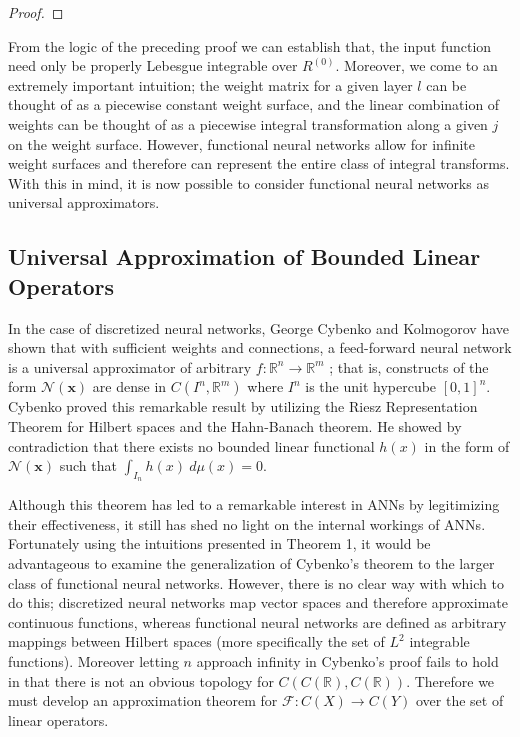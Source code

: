 \begin{proof}
\end{proof}


From the logic of the preceding proof we can establish that, the input function need only be properly Lebesgue integrable over $R^{(0)}$. Moreover, we come to an extremely important intuition; the weight matrix for a given layer $l$ can be thought of as a piecewise constant weight surface, and the linear combination of weights can be thought of as a piecewise integral transformation along a given $j$ on the weight surface. However, functional neural networks allow for infinite weight surfaces and therefore can represent the entire class of integral transforms. With this in mind, it is now possible to consider functional neural networks as universal approximators.
\subsection{Universal Approximation of Bounded Linear Operators}
In the case of discretized neural networks, George Cybenko and Kolmogorov have shown that with sufficient weights and connections, a feed-forward neural network is a universal approximator of arbitrary $f:\mathbb{R}^n \to \mathbb{R}^m$ \cite{univapprox}; that is, constructs of the form $\mathcal{N}(\pmb{x})$ are dense in $C(I^n, \mathbb{R}^m)$ where $I^n$ is the unit hypercube $[0,1]^n$.  Cybenko proved this remarkable result by utilizing the Riesz Representation Theorem for Hilbert spaces and the Hahn-Banach theorem. He showed by contradiction that there exists no bounded linear functional $h(x)$ in the form of $\mathcal{N}(\pmb{x})$ such that $\int_{I_n}h(x)\ d\mu(x) = 0$.

Although this theorem has led to a remarkable interest in ANNs by legitimizing their effectiveness, it still has shed no light on the internal workings of ANNs. Fortunately using the intuitions presented in Theorem 1, it would be advantageous to examine the generalization of Cybenko's theorem to the larger class of functional neural networks. However, there is no clear way with which to do this; discretized neural networks map vector spaces and therefore approximate continuous functions, whereas functional neural networks are defined as arbitrary mappings between Hilbert spaces (more specifically the set of $L^2$ integrable functions). Moreover letting $n$ approach infinity in Cybenko's proof fails to hold in that there is not an obvious topology for $C(C(\mathbb{R}), C(\mathbb{R}))$. Therefore we must develop an approximation theorem for $\mathcal{F}: C(X) \to C(Y)$ over the set of linear operators. 

